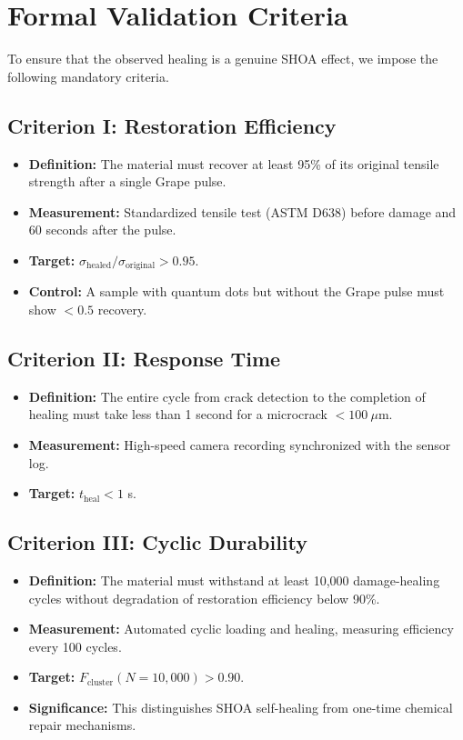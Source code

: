 \documentclass[12pt]{article}
\begin{document}
\section{Formal Validation Criteria}
To ensure that the observed healing is a genuine SHOA effect, we impose the following mandatory criteria.

\subsection{Criterion I: Restoration Efficiency}
\begin{itemize}
    \item \textbf{Definition:} The material must recover at least 95\% of its original tensile strength after a single Grape pulse.
    \item \textbf{Measurement:} Standardized tensile test (ASTM D638) before damage and 60 seconds after the pulse.
    \item \textbf{Target:} $\sigma_{\text{healed}} / \sigma_{\text{original}} > 0.95$.
    \item \textbf{Control:} A sample with quantum dots but without the Grape pulse must show $< 0.5$ recovery.
\end{itemize}

\subsection{Criterion II: Response Time}
\begin{itemize}
    \item \textbf{Definition:} The entire cycle from crack detection to the completion of healing must take less than 1 second for a microcrack $< 100~\mu$m.
    \item \textbf{Measurement:} High-speed camera recording synchronized with the sensor log.
    \item \textbf{Target:} $t_{\text{heal}} < 1$ s.
\end{itemize}

\subsection{Criterion III: Cyclic Durability}
\begin{itemize}
    \item \textbf{Definition:} The material must withstand at least 10,000 damage-healing cycles without degradation of restoration efficiency below 90\%.
    \item \textbf{Measurement:} Automated cyclic loading and healing, measuring efficiency every 100 cycles.
    \item \textbf{Target:} $F_{\text{cluster}}(N=10,000) > 0.90$.
    \item \textbf{Significance:} This distinguishes SHOA self-healing from one-time chemical repair mechanisms.
\end{itemize}
\end{document}
